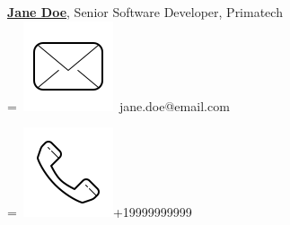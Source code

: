 \documentclass[]{latex/resume}
\begin{document}
\begin{minipage}[t]{0.25\textwidth}
    \sectionsep
    
    \href{https://www.linkedin.com/company/john-doe/}{\textbf{Jane Doe}}, Senior Software Developer, Primatech \\
    \begingroup
        =\hbox{
            \includegraphics[scale=0.1,trim={0 1cm 0cm 0cm}]{latex/icons/mail.png}\hspace{0.3cm} jane.doe@email.com
        }
        \parbox{\wd0}{}
    \endgroup
    \begingroup
        =\hbox{
            \includegraphics[scale=0.1,trim={0 1.25cm -0.4cm 0cm}]{latex/icons/phone.png}\hspace{0.3cm}+19999999999
        }
        \parbox{\wd0}{}
    \endgroup \\






\end{minipage} 
\end{document}
